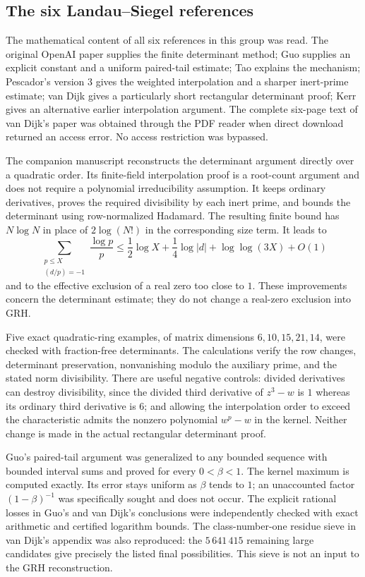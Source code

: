 \documentclass[11pt,a4paper]{article}
\theoremstyle{remark}
\newcommand{\src}[1]{\cite{#1}}
\begin{document}
\subsection{The six Landau--Siegel references}

The mathematical content of all six references in this group was
read. The original OpenAI paper supplies the finite determinant
method; Guo supplies an explicit constant and a uniform paired-tail
estimate; Tao explains the mechanism; Pescador's version 3 gives
the weighted interpolation and a sharper inert-prime estimate;
van Dijk gives a particularly short rectangular determinant proof;
Kerr gives an alternative earlier interpolation argument.
The complete six-page text of van Dijk's paper was obtained through
the PDF reader when direct download returned an access error.
No access restriction was bypassed.\src{sz-openai,sz-guo,sz-tao,sz-pescador,sz-vandijk,sz-kerr}

The companion manuscript reconstructs the determinant argument
directly over a quadratic order. Its finite-field interpolation
proof is a root-count argument and does not require a polynomial
irreducibility assumption. It keeps ordinary derivatives, proves
the required divisibility by each inert prime, and bounds the
determinant using row-normalized Hadamard. The resulting finite
bound has $N\log N$ in place of $2\log(N!)$ in the corresponding
size term. It leads to
\[
 \sum_{\substack{p\le X\\(d/p)=-1}}\frac{\log p}{p}
 \le \frac12\log X+\frac14\log|d|+\log\log(3X)+O(1)
\]
and to the effective exclusion of a real zero too close to $1$.
These improvements concern the determinant estimate; they do not
change a real-zero exclusion into GRH.

Five exact quadratic-ring examples, of matrix dimensions
$6,10,15,21,14$, were checked with fraction-free determinants.
The calculations verify the row changes, determinant preservation,
nonvanishing modulo the auxiliary prime, and the stated norm
divisibility. There are useful negative controls: divided
derivatives can destroy divisibility, since the divided third
derivative of $z^3-w$ is $1$ whereas its ordinary third derivative
is $6$; and allowing the interpolation order to exceed the
characteristic admits the nonzero polynomial $w^p-w$ in the kernel.
Neither change is made in the actual rectangular determinant proof.

Guo's paired-tail argument was generalized to any bounded sequence
with bounded interval sums and proved for every $0<\beta<1$.
The kernel maximum is computed exactly. Its error stays uniform
as $\beta$ tends to $1$; an unaccounted factor
$(1-\beta)^{-1}$ was specifically sought and does not occur.
The explicit rational losses in Guo's and van Dijk's conclusions
were independently checked with exact arithmetic and certified
logarithm bounds. The class-number-one residue sieve in van Dijk's
appendix was also reproduced: the $5\,641\,415$ remaining large
candidates give precisely the listed final possibilities. This
sieve is not an input to the GRH reconstruction.
\end{document}
